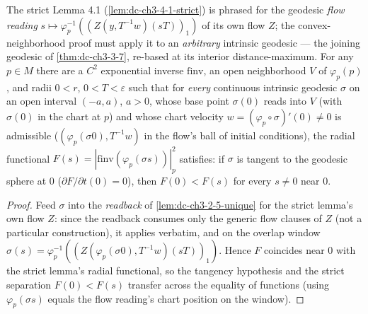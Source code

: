 \begin{lemma}
  \label{lem:dc-ch3-4-2-rebase}
  \leanok
  The strict Lemma 4.1 (\cref{lem:dc-ch3-4-1-strict}) is phrased for the geodesic
  \emph{flow reading} $s\mapsto\varphi_p^{-1}((Z(y,T^{-1}w)(sT))_1)$ of its own flow $Z$;
  the convex-neighborhood proof must apply it to an \emph{arbitrary} intrinsic geodesic — the
  joining geodesic of \cref{thm:dc-ch3-3-7}, re-based at its interior distance-maximum. For any
  $p\in M$ there are a $C^2$ exponential inverse $\mathrm{finv}$, an open neighborhood $V$ of
  $\varphi_p(p)$, and radii $0<r$, $0<T<\varepsilon$ such that for \emph{every} continuous
  intrinsic geodesic $\sigma$ on an open interval $(-a,a)$, $a>0$, whose base point $\sigma(0)$
  reads into $V$ (with $\sigma(0)$ in the chart at $p$) and whose chart velocity
  $w=(\varphi_p\circ\sigma)'(0)\neq0$ is admissible ($(\varphi_p(\sigma 0),T^{-1}w)$ in the flow's
  ball of initial conditions), the radial functional $F(s)=|\mathrm{finv}(\varphi_p(\sigma s))|_p^2$
  satisfies: if $\sigma$ is tangent to the geodesic sphere at $0$ ($\partial F/\partial t(0)=0$),
  then $F(0)<F(s)$ for every $s\neq0$ near $0$.
\end{lemma}
\begin{proof}
  \sketch
  \leanok
  Feed $\sigma$ into the \emph{readback} of \cref{lem:dc-ch3-2-5-unique} for the strict
  lemma's own flow $Z$: since
  the readback consumes only the generic flow clauses of $Z$ (not a particular construction), it
  applies verbatim, and on the overlap window $\sigma(s)=\varphi_p^{-1}((Z(\varphi_p(\sigma 0),
  T^{-1}w)(sT))_1)$. Hence $F$ coincides near $0$ with the strict lemma's radial functional, so
  the tangency hypothesis and the strict separation $F(0)<F(s)$ transfer across the equality of
  functions (using $\varphi_p(\sigma s)$ equals the flow reading's chart position on the window).

\end{proof}

